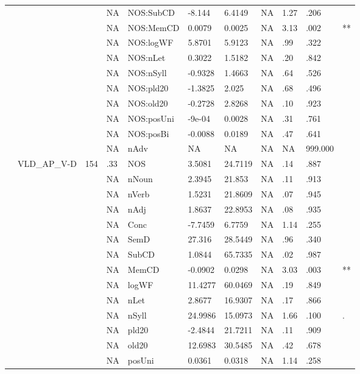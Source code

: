 \begin{table}[ht]
\begin{tabular}{lllllllllll}
   &  &  & NA & NOS:SubCD & -8.144 & 6.4149 & NA & 1.27 & .206 &   \\ 
   &  &  & NA & NOS:MemCD & 0.0079 & 0.0025 & NA & 3.13 & .002 & ** \\ 
   &  &  & NA & NOS:logWF & 5.8701 & 5.9123 & NA & .99 & .322 &   \\ 
   &  &  & NA & NOS:nLet & 0.3022 & 1.5182 & NA & .20 & .842 &   \\ 
   &  &  & NA & NOS:nSyll & -0.9328 & 1.4663 & NA & .64 & .526 &   \\ 
   &  &  & NA & NOS:pld20 & -1.3825 & 2.025 & NA & .68 & .496 &   \\ 
   &  &  & NA & NOS:old20 & -0.2728 & 2.8268 & NA & .10 & .923 &   \\ 
   &  &  & NA & NOS:posUni & -9e-04 & 0.0028 & NA & .31 & .761 &   \\ 
   &  &  & NA & NOS:posBi & -0.0088 & 0.0189 & NA & .47 & .641 &   \\ 
   &  &  & NA & nAdv & NA & NA & NA & NA & 999.000 &  \\ 
   & VLD\_AP\_V-D & 154 & .33 & NOS & 3.5081 & 24.7119 & NA & .14 & .887 &   \\ 
   &  &  & NA & nNoun & 2.3945 & 21.853 & NA & .11 & .913 &   \\ 
   &  &  & NA & nVerb & 1.5231 & 21.8609 & NA & .07 & .945 &   \\ 
   &  &  & NA & nAdj & 1.8637 & 22.8953 & NA & .08 & .935 &   \\ 
   &  &  & NA & Conc & -7.7459 & 6.7759 & NA & 1.14 & .255 &   \\ 
   &  &  & NA & SemD & 27.316 & 28.5449 & NA & .96 & .340 &   \\ 
   &  &  & NA & SubCD & 1.0844 & 65.7335 & NA & .02 & .987 &   \\ 
   &  &  & NA & MemCD & -0.0902 & 0.0298 & NA & 3.03 & .003 & ** \\ 
   &  &  & NA & logWF & 11.4277 & 60.0469 & NA & .19 & .849 &   \\ 
   &  &  & NA & nLet & 2.8677 & 16.9307 & NA & .17 & .866 &   \\ 
   &  &  & NA & nSyll & 24.9986 & 15.0973 & NA & 1.66 & .100 & . \\ 
   &  &  & NA & pld20 & -2.4844 & 21.7211 & NA & .11 & .909 &   \\ 
   &  &  & NA & old20 & 12.6983 & 30.5485 & NA & .42 & .678 &   \\ 
   &  &  & NA & posUni & 0.0361 & 0.0318 & NA & 1.14 & .258 &   \\ 

\end{tabular}
\end{table}
